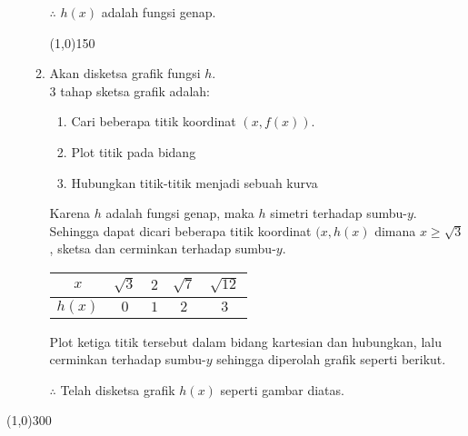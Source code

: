 \begin{enumerate}[leftmargin=*, label={\arabic*}.]
\begin{enumerate}[label={\alph*}.]
    $\therefore$ $h(x)$ adalah fungsi genap.
\begin{center}
    \line(1,0){150}
\end{center}
    \item Akan disketsa grafik fungsi $h$.\\
    3 tahap sketsa grafik adalah:
    \begin{enumerate}[label={\arabic*})]
        \item Cari beberapa titik koordinat $(x,f(x))$.
        \item Plot titik pada bidang
        \item Hubungkan titik-titik menjadi sebuah kurva
    \end{enumerate}
    Karena $h$ adalah fungsi genap, maka $h$ simetri terhadap sumbu-$y$.
    Sehingga dapat dicari beberapa titik koordinat $(x,h(x)$ dimana 
    $x \geq \sqrt{3}$, sketsa dan cerminkan terhadap sumbu-$y$.
    \begin{center}
    \begin{tabular}{|c|c|c|c|c|}\hline
        $x$ & $\sqrt{3}$ & $2$ & $\sqrt{7}$ & $\sqrt{12}$ \\ \hline
        $h(x)$ & $0$ & $1$ & $2$ & $3$ \\ \hline
    \end{tabular}
    \end{center}
    Plot ketiga titik tersebut dalam bidang kartesian dan hubungkan, lalu cerminkan
    terhadap sumbu-$y$ sehingga diperolah grafik seperti berikut.
    \begin{center}
        \end{center}
        $\therefore$ Telah disketsa grafik $h(x)$ seperti gambar diatas.
\end{enumerate}
\end{enumerate}

\begin{center}
    \line(1,0){300}
\end{center}